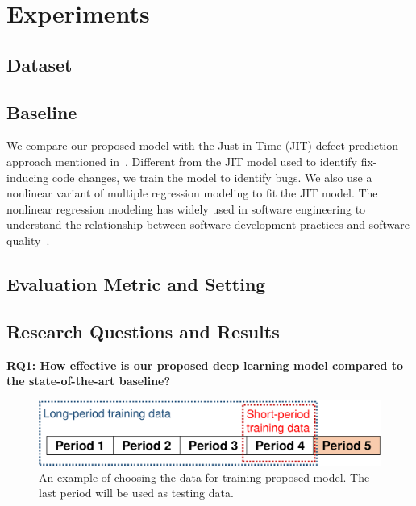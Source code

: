 \section{Experiments}
\label{sec:exp}

\subsection{Dataset}
\subsection{Baseline}
\label{sec:baseline}
We compare our proposed model with the Just-in-Time (JIT) defect prediction approach mentioned in~\cite{mcintosh2018fix}. Different from the JIT model used to identify fix-inducing code changes, we train the model to identify bugs. We also use a nonlinear variant of multiple regression modeling to fit the JIT model. The nonlinear regression modeling has widely used in software engineering to understand the relationship between software development practices and software quality~\cite{zhou2011does, morales2015code, mcintosh2016empirical}. 

\subsection{Evaluation Metric and Setting}
\label{sec:metric_setting}

\subsection{Research Questions and Results}
\label{sec:rq_results}

\noindent \textbf{RQ1: How effective is our proposed deep learning model compared to the state-of-the-art baseline?}

\begin{figure}
\center
\includegraphics[scale=0.36]{figs/split.pdf}
\caption{An example of choosing the data for training proposed model. The last period will be used as testing data.}
\label{fig:overview}
\end{figure}

